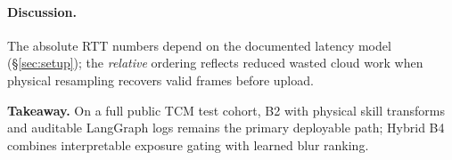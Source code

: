 

\paragraph{Discussion.}
The absolute RTT numbers depend on the documented latency model (\S\ref{sec:setup}); the \emph{relative} ordering reflects reduced wasted cloud work when physical resampling recovers valid frames before upload.

\textbf{Takeaway.} On a full public TCM test cohort, B2 with physical skill transforms and auditable LangGraph logs remains the primary deployable path; Hybrid B4 combines interpretable exposure gating with learned blur ranking.
